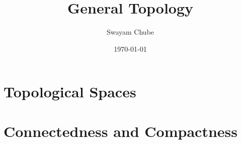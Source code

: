 \documentclass[12pt]{report}
\title{General Topology}
\author{Swayam Chube}
\date{\today}
\begin{document}
    \maketitle
    \tableofcontents
    \chapter{Topological Spaces}
    

	\chapter{Connectedness and Compactness}
	
\end{document}
